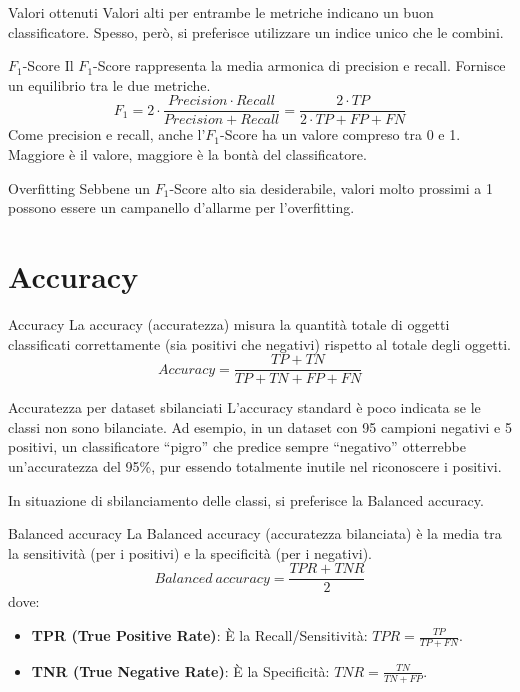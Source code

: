 \begin{nota}{Valori ottenuti}{}
Valori alti per entrambe le metriche indicano un buon classificatore.
Spesso, però, si preferisce utilizzare un indice unico che le combini.
\end{nota}
\bigskip
\begin{definizione}{$F_1$-Score}{}
Il $F_1$-Score rappresenta la media armonica di precision e recall.
Fornisce un equilibrio tra le due metriche.
\[
F_{1} = 2 \cdot \frac{Precision \cdot Recall}{Precision + Recall}
      = \frac{2 \cdot TP}{2 \cdot TP + FP + FN}
\]
Come precision e recall, anche l'$F_1$-Score ha un valore compreso tra 0 e 1.
Maggiore è il valore, maggiore è la bontà del classificatore.
\end{definizione}

\begin{nota}{Overfitting}{}
Sebbene un $F_1$-Score alto sia desiderabile, valori molto prossimi a 1
possono essere un campanello d'allarme per l'overfitting.
\end{nota}

\section{Accuracy}

\begin{definizione}{Accuracy}{}
La accuracy (accuratezza) misura la quantità totale di oggetti classificati
correttamente (sia positivi che negativi) rispetto al totale degli oggetti.
\[
Accuracy = \frac{TP+TN}{TP+TN+FP+FN}
\]
\end{definizione}

\begin{nota}{Accuratezza per dataset sbilanciati}{}
L'accuracy standard è poco indicata se le classi non sono bilanciate.
Ad esempio, in un dataset con 95 campioni negativi e 5 positivi,
un classificatore ``pigro'' che predice sempre ``negativo'' otterrebbe un'accuratezza
del 95\%, pur essendo totalmente inutile nel riconoscere i positivi.
\end{nota}

In situazione di sbilanciamento delle classi, si preferisce la Balanced accuracy.

\begin{definizione}{Balanced accuracy}{}
La Balanced accuracy (accuratezza bilanciata) è la media tra la sensitività
(per i positivi) e la specificità (per i negativi).
\[
Balanced\ accuracy = \frac{TPR + TNR}{2}
\]
dove:
\begin{itemize}
    \item \textbf{TPR (True Positive Rate)}: È la Recall/Sensitività:
    $TPR = \frac{TP}{TP+FN}$.
    \item \textbf{TNR (True Negative Rate)}: È la Specificità:
    $TNR = \frac{TN}{TN+FP}$.
\end{itemize}
\end{definizione}

